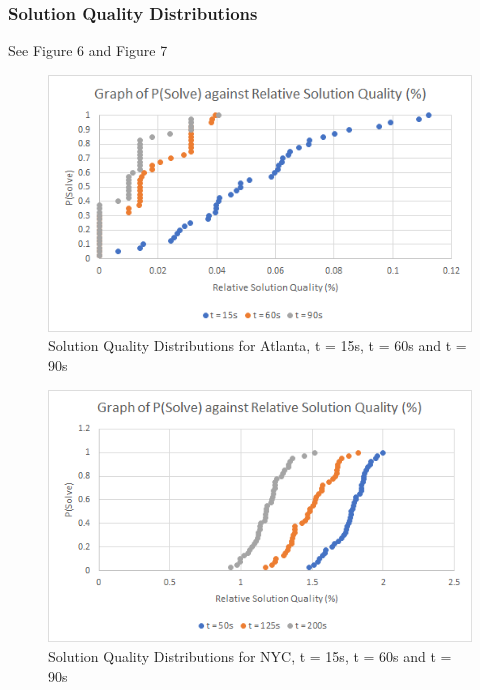\documentclass[sigconf]{acmart}
\begin{document}
\subsubsection{Solution Quality Distributions}
See Figure 6 and Figure 7
\begin{figure}[h]
  \centering
  \includegraphics[width=\linewidth=]{genetic_sqd_Atlanta.png}
  \caption{Solution Quality Distributions for Atlanta, t = 15s, t = 60s and t = 90s}
\end{figure}
\begin{figure}[h]
  \centering
  \includegraphics[width=\linewidth]{genetic_sqd_NYC.png}
  \caption{Solution Quality Distributions for NYC, t = 15s, t = 60s and t = 90s}
\end{figure}
\end{document}

